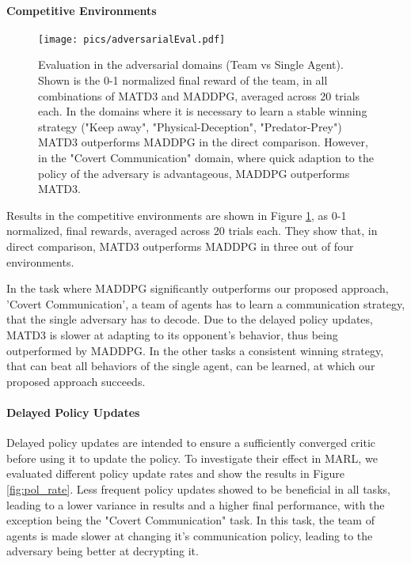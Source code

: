 \documentclass{article}
\begin{document}
\paragraph{Competitive Environments}
\begin{figure}[t]
	
	\texttt{[image: pics/adversarialEval.pdf]}
	\centering
	\caption{Evaluation in the adversarial domains (Team vs Single Agent). 
		Shown is the 0-1 normalized final reward of the team, in all combinations of MATD3 and MADDPG, averaged across 20 trials each.
		In the domains where it is necessary to learn a stable winning strategy ("Keep away", "Physical-Deception", "Predator-Prey") MATD3 outperforms MADDPG in the direct comparison.
		However, in the "Covert Communication" domain, where quick adaption to the policy of the adversary is advantageous, MADDPG outperforms MATD3.
	}
	\label{fig:competitive-eval}
	\vspace{-0.2cm}
\end{figure}
Results in the competitive environments are shown in Figure \ref{fig:competitive-eval}, as 0-1 normalized, final rewards, averaged across 20 trials each.
They show that, in direct comparison, MATD3 outperforms MADDPG in three out of four environments.

In the task where \gls*{MADDPG} significantly outperforms our proposed approach, 'Covert Communication', a team of agents has to learn a communication strategy, that the single adversary has to decode.
Due to the delayed policy updates, MATD3 is slower at adapting to its opponent's behavior, thus being outperformed by MADDPG.
In the other tasks a consistent winning strategy, that can beat all behaviors of the single agent, can be learned, at which our proposed approach succeeds.
\paragraph{Delayed Policy Updates}
Delayed policy updates are intended to ensure a sufficiently converged critic before using it to update the policy.
To investigate their effect in \gls*{MARL}, we evaluated different policy update rates and show the results in Figure \ref{fig:pol_rate}.
Less frequent policy updates showed to be beneficial in all tasks, leading to a lower variance in results and a higher final performance, with the exception being the "Covert Communication" task. 
In this task, the team of agents is made slower at changing it's communication policy, leading to the adversary being better at decrypting it.
\end{document}
